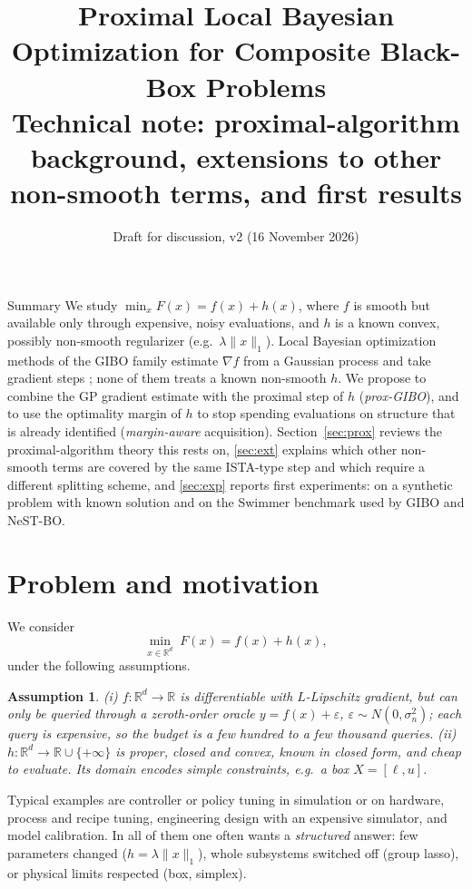 \documentclass[10pt]{article}
\title{\vspace{-1.2cm}Proximal Local Bayesian Optimization for Composite Black-Box Problems\\[3pt]
\large Technical note: proximal-algorithm background, extensions to other non-smooth terms, and first results}
\author{Draft for discussion, v2 (16 November 2026)}
\date{}
\newcommand{\R}{\mathbb{R}}
\newtheorem{assumption}{Assumption}
\theoremstyle{remark}
\begin{document}
\maketitle
\vspace{-0.9cm}

\begin{keybox}{Summary}
We study $\min_{x} F(x)=f(x)+h(x)$, where $f$ is smooth but available only through expensive, noisy evaluations, and $h$ is a known
convex, possibly non-smooth regularizer (e.g.\ $\lambda\|x\|_1$). Local Bayesian optimization methods of the GIBO family estimate $\nabla f$
from a Gaussian process and take gradient steps \citep{muller2021gibo,nguyen2022mpd,wu2023behavior,tang2026nestbo,jing2026lcbo}; none of
them treats a known non-smooth $h$. We propose to combine the GP gradient estimate with the proximal step of $h$
(\emph{prox-GIBO}), and to use the optimality margin of $h$ to stop spending evaluations on structure that is already identified
(\emph{margin-aware} acquisition). Section~\ref{sec:prox} reviews the proximal-algorithm theory this rests on, \cref{sec:ext} explains
which other non-smooth terms are covered by the same ISTA-type step and which require a different splitting scheme, and
\cref{sec:exp} reports first experiments: on a synthetic problem with known solution and on the Swimmer benchmark used by GIBO and NeST-BO.
\end{keybox}

\section{Problem and motivation}\label{sec:problem}

We consider
\begin{equation}\label{eq:P}
\min_{x\in\R^d}\; F(x) = f(x) + h(x),
\end{equation}
under the following assumptions.
\begin{assumption}\label{ass:main}
(i) $f:\R^d\to\R$ is differentiable with $L$-Lipschitz gradient, but can only be queried through a zeroth-order oracle
$y=f(x)+\varepsilon$, $\varepsilon\sim N(0,\sigma_n^2)$; each query is expensive, so the budget is a few hundred to a few thousand queries.
(ii) $h:\R^d\to\R\cup\{+\infty\}$ is proper, closed and convex, known in closed form, and cheap to evaluate. Its domain encodes simple
constraints, e.g.\ a box $X=[\ell,u]$.
\end{assumption}
Typical examples are controller or policy tuning in simulation or on hardware, process and recipe tuning, engineering design with an expensive
simulator, and model calibration. In all of them one often wants a \emph{structured} answer: few parameters changed ($h=\lambda\|x\|_1$),
whole subsystems switched off (group lasso), or physical limits respected (box, simplex).
\end{document}
